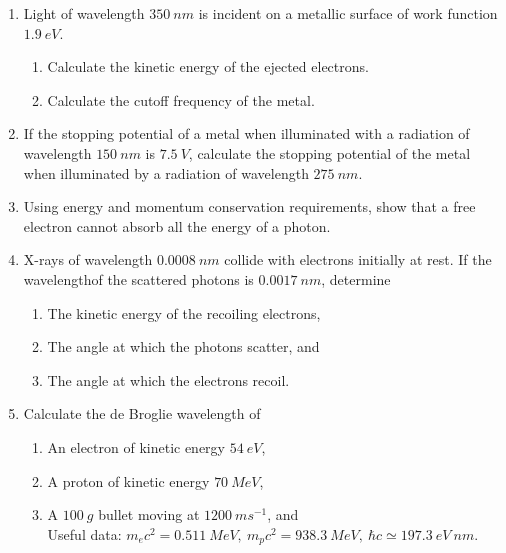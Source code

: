 \documentclass[fleqn]{article}
\begin{document}
  \begin{enumerate}
    \item Light of wavelength $350 ~ nm$ is incident on a metallic surface of work function $1.9 ~ eV$.
    \begin{enumerate}
      \item Calculate the kinetic  energy of the ejected electrons. 
      \item Calculate the cutoff frequency of the metal.
    \end{enumerate}

    \item If the stopping potential of a metal when illuminated with a radiation of wavelength $150 ~ nm$ is $7.5 ~ V$, 
    calculate the stopping potential of the metal when illuminated by a radiation of wavelength $275 ~ nm$.


    \item Using energy and momentum conservation requirements, show that a free electron cannot absorb all the energy of a photon.

    \item X-rays of wavelength $0.0008 ~ nm$ collide with electrons initially at rest. If the wavelengthof the scattered photons is 
    $0.0017 ~ nm$, determine
      \begin{enumerate}
        \item The kinetic energy of the recoiling electrons,
        \item The angle at which the photons scatter, and
        \item The angle at which the electrons recoil. 
      \end{enumerate}

    \item Calculate the de Broglie wavelength of
      \begin{enumerate}
        \item An electron of kinetic energy $54 ~ eV$, 
        \item A proton of kinetic energy $70 ~ MeV$, 
        \item A $100 ~ g$ bullet moving at $1200 ~ ms^{-1}$, and \\

        Useful data: $m_ec^2=0.511 ~ MeV, ~ m_pc^2=938.3 ~ MeV, ~ \hbar c \simeq 197.3 ~ eV ~ nm$.
      \end{enumerate}

  \end{enumerate}
\end{document}
